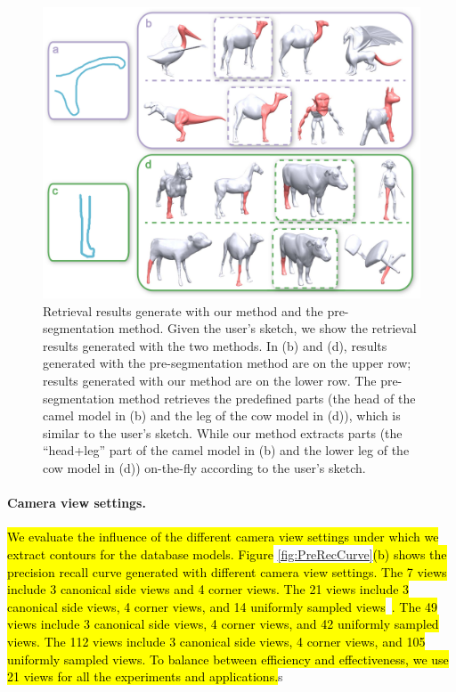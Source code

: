 \begin{figure}\centering
\includegraphics[width=1.0\linewidth]{./Material/Comp2PreSeg.pdf}
\caption{Retrieval results generate with our method and the pre-segmentation method. Given the user's sketch, we show the retrieval results generated with the two methods. In (b) and (d), results generated with the pre-segmentation method are on the upper row; results generated with our method are on the lower row. The pre-segmentation method retrieves the predefined parts (the head of the camel model in (b) and the leg of the cow model in (d)), which is similar to the user's sketch. While our method extracts parts (the ``head+leg'' part of the camel model in (b) and the lower leg of the cow model in (d)) on-the-fly according to the user's sketch.}\label{fig:Comp2PreSeg}
\end{figure}

\paragraph*{Camera view settings.} \hl{We evaluate the influence of the different camera view settings under which we extract contours for the database models. Figure }\ref{fig:PreRecCurve}\hl{(b) shows the precision recall curve generated with different camera view settings. The 7 views include 3 canonical side views and 4 corner views. The 21 views include 3 canonical side views, 4 corner views, and 14 uniformly sampled views}~\cite{FanWang2013}\hl{. The 49 views include 3 canonical side views, 4 corner views, and 42 uniformly sampled views. The 112 views include 3 canonical side views, 4 corner views, and 105 uniformly sampled views. To balance between efficiency and effectiveness, we use 21 views for all the experiments and applications.}s